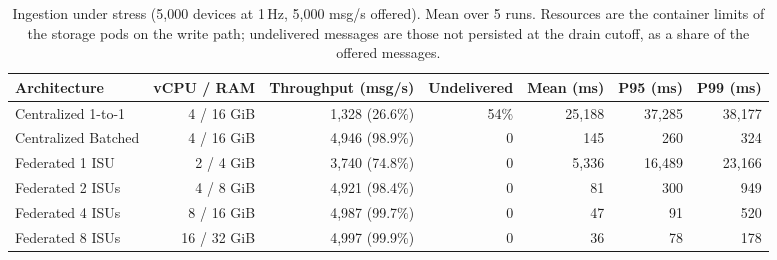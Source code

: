 \begin{table}[t]
\centering
\caption{Ingestion under stress (5{,}000 devices at 1\,Hz, 5{,}000 msg/s offered). Mean over 5 runs. Resources are the container limits of the storage pods on the write path; undelivered messages are those not persisted at the drain cutoff, as a share of the offered messages.}
\label{tab:ingestion-stress}
\begin{tabular}{lrrrrrr}
\toprule
Architecture & vCPU / RAM & Throughput (msg/s) & Undelivered & Mean (ms) & P95 (ms) & P99 (ms) \\
\midrule
Centralized 1-to-1 & 4 / 16 GiB & 1{,}328 (26.6\%) & 54\% & 25{,}188 & 37{,}285 & 38{,}177 \\
Centralized Batched & 4 / 16 GiB & 4{,}946 (98.9\%) & 0 & 145 & 260 & 324 \\
\midrule
Federated 1 ISU & 2 / 4 GiB & 3{,}740 (74.8\%) & 0 & 5{,}336 & 16{,}489 & 23{,}166 \\
Federated 2 ISUs & 4 / 8 GiB & 4{,}921 (98.4\%) & 0 & 81 & 300 & 949 \\
Federated 4 ISUs & 8 / 16 GiB & 4{,}987 (99.7\%) & 0 & 47 & 91 & 520 \\
Federated 8 ISUs & 16 / 32 GiB & 4{,}997 (99.9\%) & 0 & 36 & 78 & 178 \\
\bottomrule
\end{tabular}
\end{table}
